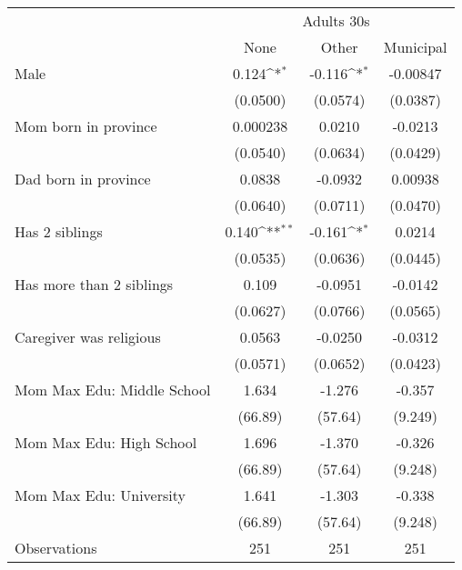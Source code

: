 {
\def\sym#1{\ifmmode^{#1}\else\(^{#1}\)\fi}
\begin{tabular}{l*{3}{c}}
\toprule
	& \multicolumn{3}{c}{Adults 30s} \\
                    &\multicolumn{1}{c}{None}&\multicolumn{1}{c}{Other}&\multicolumn{1}{c}{Municipal}\\
\midrule
Male                &       0.124\sym{*}  &      -0.116\sym{*}  &    -0.00847         \\
                    &    (0.0500)         &    (0.0574)         &    (0.0387)         \\
\addlinespace
Mom born in province&    0.000238         &      0.0210         &     -0.0213         \\
                    &    (0.0540)         &    (0.0634)         &    (0.0429)         \\
\addlinespace
Dad born in province&      0.0838         &     -0.0932         &     0.00938         \\
                    &    (0.0640)         &    (0.0711)         &    (0.0470)         \\
\addlinespace
Has 2 siblings      &       0.140\sym{**} &      -0.161\sym{*}  &      0.0214         \\
                    &    (0.0535)         &    (0.0636)         &    (0.0445)         \\
\addlinespace
Has more than 2 siblings&       0.109         &     -0.0951         &     -0.0142         \\
                    &    (0.0627)         &    (0.0766)         &    (0.0565)         \\
\addlinespace
Caregiver was religious&      0.0563         &     -0.0250         &     -0.0312         \\
                    &    (0.0571)         &    (0.0652)         &    (0.0423)         \\
\addlinespace
Mom Max Edu: Middle School&       1.634         &      -1.276         &      -0.357         \\
                    &     (66.89)         &     (57.64)         &     (9.249)         \\
\addlinespace
Mom Max Edu: High School&       1.696         &      -1.370         &      -0.326         \\
                    &     (66.89)         &     (57.64)         &     (9.248)         \\
\addlinespace
Mom Max Edu: University&       1.641         &      -1.303         &      -0.338         \\
                    &     (66.89)         &     (57.64)         &     (9.248)         \\
\midrule
Observations        &         251         &         251         &         251         \\
\bottomrule
\end{tabular}
}